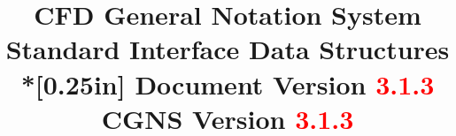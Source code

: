 \documentclass[11pt,twoside]{article}
\begin{document}
%
%
%


\fancyfoot[LE,RO]{\bfseries \thepage}

\posttitle{\par\end{flushleft}\vskip 1.0em}
\title{{\bfseries CFD General Notation System\\
Standard Interface Data Structures}\\*[0.25in]
{\Large Document Version \textcolor{red}{3.1.3}\\
CGNS Version \textcolor{red}{3.1.3}}}
\author{}
\date{}
\maketitle
\thispagestyle{empty}

\end{document}
